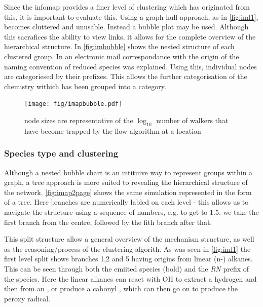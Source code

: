 Since the infomap provides a finer level of clustering which has originated from this, it is important to evaluate this. Using a graph-hull approach, as in \autoref{fig:iml1}, becomes cluttered and unusable. Instead a bubble plot may be used. Although this sacrafices the ability to view links, it allows for the complete overview of the hierarchical structure. In \autoref{fig:imbubble} shows the nested structure of each clustered group. In an electronic mail correspondance with \cite{correspondance} the origin of the naming convention of reduced species was explained. Using this, individual nodes are categoriesed by their prefixes. This allows the further categorisation of the chemistry withich has been grouped into a category.

\begin{figure}[H]
  \centering
  \texttt{[image: fig/imapbubble.pdf]}
  \caption{\textbf{}node sizes are representative of the $\log_{10}$ number of walkers that have become trapped by the flow algorithm at a location}
    \label{fig:imbubble}
\end{figure}




\subsubsection{Species type and clustering}
Although a nested bubble chart is an intituive way to represent groups within a graph, a tree approach is more suited to revealing the hierarchical structure of the network. \autoref{fig:imap2page} shows the same simulation represented in the form of a tree. Here branches are numerically labled on each level - this allows us to navigate the structure using a sequence of numbers, e.g. to get to 1.5. we take the first branch from the centre, followed by the fith branch after that.

This split structure allow a general overview of the mechanism structure, as well as the reasoning/process of the clustering algorith. As was seen in \autoref{fig:iml1} the first level split shows branches 1,2 and 5 having origins from linear (n-) alkanes. This can be seen through both the emiited species (bold) and the \emph{RN} prefix of the species. Here the linear alkanes can react with OH to extract a hydrogen and then from an , or produce a cabonyl \emph{}, which can then go on to produce the \emph{} peroxy radical.


